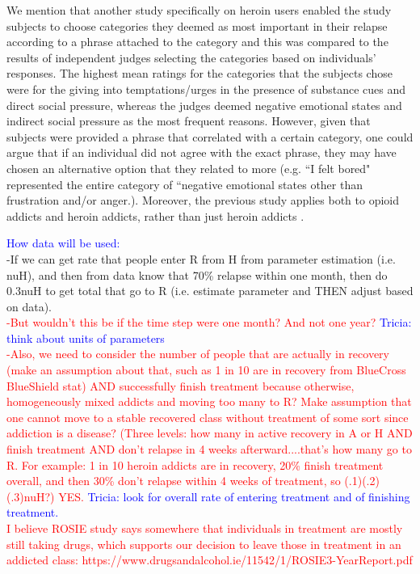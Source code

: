 \documentclass[12pt]{article}
\begin{document}
We mention that another study specifically on heroin users enabled the study subjects to choose categories they deemed as most important in their relapse according to a phrase attached to the category and this was compared to the results of independent judges selecting the categories based on individuals' responses. The highest mean ratings for the categories that the subjects chose were for the giving into temptations/urges in the presence of substance cues and direct social pressure, whereas the judges deemed negative emotional states and indirect social pressure as the most frequent reasons. However, given that subjects were provided a phrase that correlated with a certain category, one could argue that if an individual did not agree with the exact phrase, they may have chosen an alternative option that they related to more (e.g. ``I felt bored" represented the entire category of ``negative emotional states other than frustration and/or anger.). Moreover, the previous study applies both to opioid addicts and heroin addicts, rather than just heroin addicts \cite{Heather}.


\textcolor{blue}{How data will be used:} \\
-If we can get rate that people enter R from H from parameter estimation (i.e. nuH), and then from data know that 70\% relapse within one month, then do 0.3nuH to get total that go to R (i.e. estimate parameter and THEN adjust based on data).\\ 
\textcolor{red}{-But wouldn't this be if the time step were one month? And not one year? \textcolor{blue}{Tricia: think about units of parameters} \\
-Also, we need to consider the number of people that are actually in recovery (make an assumption about that, such as 1 in 10 are in recovery from BlueCross BlueShield stat) AND successfully finish treatment because otherwise, homogeneously mixed addicts and moving too many to R? Make assumption that one cannot move to a stable recovered class without treatment of some sort since addiction is a disease? (Three levels: how many in active recovery in A or H AND finish treatment AND don't relapse in 4 weeks afterward....that's how many go to R. For example: 1 in 10 heroin addicts are in recovery, 20\% finish treatment overall, and then 30\% don't relapse within 4 weeks of treatment, so (.1)(.2)(.3)nuH?) YES.} \textcolor{blue}{Tricia: look for overall rate of entering treatment and of finishing treatment.\\}
\textcolor{red}{I believe ROSIE study says somewhere that individuals in treatment are mostly still taking drugs, which supports our decision to leave those in treatment in an addicted class: https://www.drugsandalcohol.ie/11542/1/ROSIE3-YearReport.pdf} \\ \\
\end{document}
